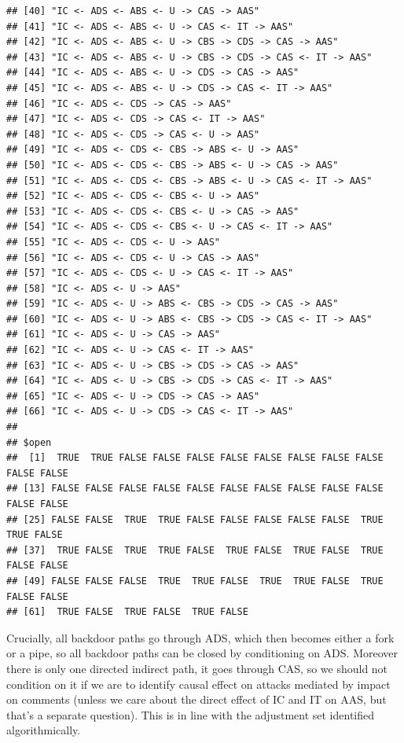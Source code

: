 \documentclass[10pt,dvipsnames,enabledeprecatedfontcommands]{scrartcl}
\begin{document}
\begin{verbatim}
## [40] "IC <- ADS <- ABS <- U -> CAS -> AAS"                    
## [41] "IC <- ADS <- ABS <- U -> CAS <- IT -> AAS"              
## [42] "IC <- ADS <- ABS <- U -> CBS -> CDS -> CAS -> AAS"      
## [43] "IC <- ADS <- ABS <- U -> CBS -> CDS -> CAS <- IT -> AAS"
## [44] "IC <- ADS <- ABS <- U -> CDS -> CAS -> AAS"             
## [45] "IC <- ADS <- ABS <- U -> CDS -> CAS <- IT -> AAS"       
## [46] "IC <- ADS <- CDS -> CAS -> AAS"                         
## [47] "IC <- ADS <- CDS -> CAS <- IT -> AAS"                   
## [48] "IC <- ADS <- CDS -> CAS <- U -> AAS"                    
## [49] "IC <- ADS <- CDS <- CBS -> ABS <- U -> AAS"             
## [50] "IC <- ADS <- CDS <- CBS -> ABS <- U -> CAS -> AAS"      
## [51] "IC <- ADS <- CDS <- CBS -> ABS <- U -> CAS <- IT -> AAS"
## [52] "IC <- ADS <- CDS <- CBS <- U -> AAS"                    
## [53] "IC <- ADS <- CDS <- CBS <- U -> CAS -> AAS"             
## [54] "IC <- ADS <- CDS <- CBS <- U -> CAS <- IT -> AAS"       
## [55] "IC <- ADS <- CDS <- U -> AAS"                           
## [56] "IC <- ADS <- CDS <- U -> CAS -> AAS"                    
## [57] "IC <- ADS <- CDS <- U -> CAS <- IT -> AAS"              
## [58] "IC <- ADS <- U -> AAS"                                  
## [59] "IC <- ADS <- U -> ABS <- CBS -> CDS -> CAS -> AAS"      
## [60] "IC <- ADS <- U -> ABS <- CBS -> CDS -> CAS <- IT -> AAS"
## [61] "IC <- ADS <- U -> CAS -> AAS"                           
## [62] "IC <- ADS <- U -> CAS <- IT -> AAS"                     
## [63] "IC <- ADS <- U -> CBS -> CDS -> CAS -> AAS"             
## [64] "IC <- ADS <- U -> CBS -> CDS -> CAS <- IT -> AAS"       
## [65] "IC <- ADS <- U -> CDS -> CAS -> AAS"                    
## [66] "IC <- ADS <- U -> CDS -> CAS <- IT -> AAS"              
## 
## $open
##  [1]  TRUE  TRUE FALSE FALSE FALSE FALSE FALSE FALSE FALSE FALSE FALSE FALSE
## [13] FALSE FALSE FALSE FALSE FALSE FALSE FALSE FALSE FALSE FALSE FALSE FALSE
## [25] FALSE FALSE  TRUE  TRUE FALSE FALSE FALSE FALSE FALSE  TRUE  TRUE FALSE
## [37]  TRUE FALSE  TRUE  TRUE FALSE  TRUE FALSE  TRUE FALSE  TRUE FALSE FALSE
## [49] FALSE FALSE FALSE  TRUE  TRUE FALSE  TRUE  TRUE FALSE  TRUE FALSE FALSE
## [61]  TRUE FALSE  TRUE FALSE  TRUE FALSE
\end{verbatim}

\normalsize

Crucially, all backdoor paths go through \textsf{ADS}, which then
becomes either a fork or a pipe, so all backdoor paths can be closed by
conditioning on \textsf{ADS}. Moreover there is only one directed
indirect path, it goes through \textsf{CAS}, so we should not condition
on it if we are to identify causal effect on attacks mediated by impact
on comments (unless we care about the direct effect of \textsf{IC} and
\textsf{IT} on \textsf{AAS}, but that's a separate question). This is in
line with the adjustment set identified algorithmically.
\end{document}
